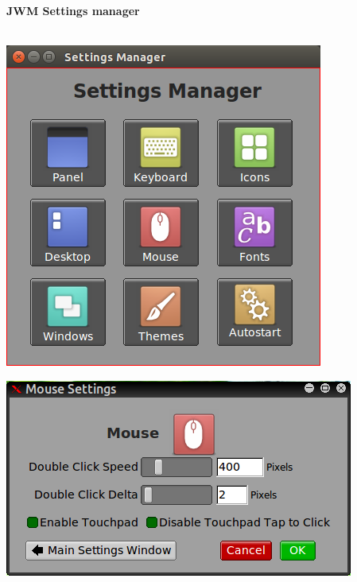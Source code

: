 \documentclass[12pt,a4paper]{book}
\begin{document}
{\large \textbf{JWM Settings manager}} \\ \\


\begin{center}
\includegraphics[width=0.7\linewidth]{jwmsettingsmanager}
\end{center}

\begin{center}
\includegraphics[width=0.7\linewidth]{mouse-settings}
\end{center}
\end{document}

